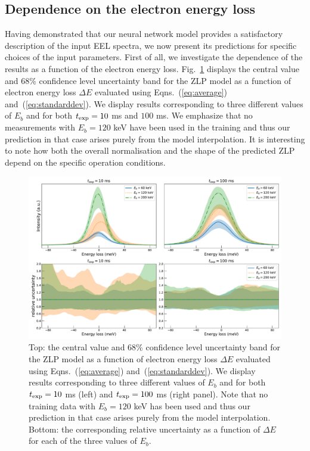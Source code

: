 \subsection{Dependence on the electron energy loss}
\label{eq:depdeltae}

Having demonstrated that our neural network model provides a satisfactory description
of the input EEL spectra, we now present its  predictions for specific
choices of the input parameters.
%
First of all, we investigate the dependence of the results as a function of the
electron energy loss.
%
Fig.~\ref{fig:EELS_vacuum_DeltaE} displays the central value and 68\% confidence level uncertainty band
for the ZLP model as a function
of electron energy loss $\Delta E$
evaluated using Eqns.~(\ref{eq:average}) and~(\ref{eq:standarddev}).
%
We display results corresponding to 
three different values of $E_b$  and for both
$t_{\rm exp}=10$ ms and  $100$ ms.
%
We emphasize that no measurements with $E_b=120$ keV have been used in the training and thus our prediction
in that case arises purely from the model interpolation.
%
It is interesting to note how both the overall normalisation and the shape of
the predicted ZLP depend on the specific operation conditions.

\begin{figure}[t]
    \centering
    \includegraphics[width=170mm]{plots/deltaE_dependence_vacuum.pdf}
    \caption{\small Top: the central value and 68\% confidence level uncertainty band
      for the ZLP model as a function
      of electron energy loss $\Delta E$
      evaluated using Eqns.~(\ref{eq:average}) and~(\ref{eq:standarddev}).
      We display results corresponding to 
      three different values of $E_b$  and for both
      $t_{\rm exp}=10$ ms (left)  and $t_{\rm exp}=100$ ms (right panel).
      Note that no training data with $E_b=120$ keV has been used and thus our prediction
      in that case arises purely from the model interpolation.
      Bottom: the corresponding relative uncertainty as a function of $\Delta E$
      for each of the three values of $E_b$.
      \label{fig:EELS_vacuum_DeltaE}}
\end{figure}


